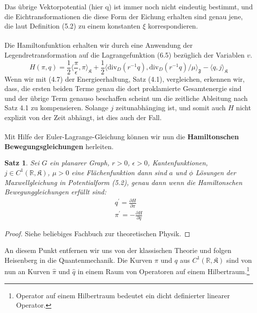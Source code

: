 \documentclass[11pt,a4paper,leqno]{report}
\newtheorem{proposition}{Satz}[chapter]
\numberwithin{equation}{chapter}
\begin{document}
\noindent
Das \"ubrige Vektorpotential (hier q) ist immer noch nicht eindeutig bestimmt, und die Eichtransformationen die diese Form der Eichung erhalten sind genau jene, die laut Definition (5.2) zu einem konstanten $\xi$ korrespondieren.\\
\\
Die Hamiltonfunktion erhalten wir durch eine Anwendung der Legendretransformation auf die Lagrangefunktion (6.5) bez\"uglich der Variablen $v$.
\begin{equation}
	H(\pi, q) = \frac{1}{2}\langle \frac{\pi}{\epsilon}, \pi\rangle_{\mathfrak{K}} + \frac{1}{2}\langle \text{div}_D(r^{-1}q), \text{div}_D(r^{-1}q)/\mu\rangle_{\mathfrak{F}} - \langle q, j\rangle_{\mathfrak{K}}
\end{equation}
Wenn wir mit (4.7) der Energieerhaltung, Satz (4.1), vergleichen, erkennen wir, dass, die ersten beiden Terme genau die dort proklamierte Gesamtenergie sind und der \"ubrige Term genauso beschaffen scheint um die zeitliche Ableitung nach Satz 4.1 zu kompensieren. Solange $j$ zeitunabh\"anging ist, und somit auch $H$ nicht explizit von der Zeit abh\"angt, ist dies auch der Fall.\\
\\
Mit Hilfe der Euler-Lagrange-Gleichung k\"onnen wir nun die \textbf{Hamiltonschen Bewegungsgleichungen} herleiten.
\begin{proposition}
Sei $G$ ein planarer Graph, $r>0$, $\epsilon>0$,  Kantenfunktionen, $j\in C^1(\mathbb{R}, \mathfrak{K})$, $\mu>0$ eine Fl\"achenfunktion dann sind $a$ und $\phi$ L\"osungen der Maxwellgleichung in Potentialform (5.2), genau dann wenn die Hamiltonschen Bewegunggleichungen erf\"ullt sind:
\begin{align}
	q^\prime = \frac{\partial H}{\partial \pi}\\
	\pi^\prime = - \frac{\partial H}{\partial q}
\end{align}
\end{proposition}
\begin{proof}
	Siehe beliebiges Fachbuch zur theoretischen Physik.
\end{proof}
\noindent
An diesem Punkt entfernen wir uns von der klassischen Theorie und folgen Heisenberg in die Quantenmechanik. Die Kurven $\pi$ und $q$ aus $C^1(\mathbb{R}, \mathfrak{K})$ sind von nun an Kurven $\hat{\pi}$ und $\hat{q}$ in einem Raum von Operatoren auf einem Hilbertraum.\footnote{Operator auf einem Hilbertraum bedeutet ein dicht definierter linearer Operator.}
\end{document}
